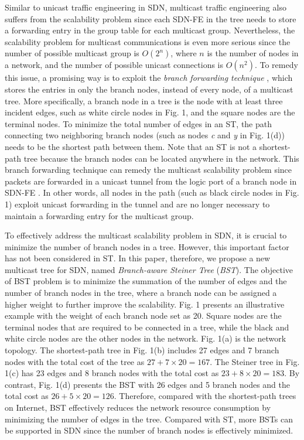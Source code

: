 \documentclass[conference]{IEEEtran}
\begin{document}
Similar to unicast traffic engineering in SDN, multicast traffic engineering
also suffers from the scalability problem since each SDN-FE in the tree
needs to store a forwarding entry in the group table for each multicast
group. Nevertheless, the scalability problem for multicast communications is
even more serious since the number of possible multicast group is $O(2^{n})$, where $n$ is the number of nodes in a network, and the number of possible
unicast connections is $O(n^{2})$. To remedy this issue, a promising way is
to exploit the \textit{branch forwarding technique} \cite{Yang2008, YangLiao2008, Tian1998, Stoica2000, Wong2000}, which stores the
entries in only the branch nodes, instead of every node, of a multicast
tree. More specifically, a branch node in a tree is the node with at least
three incident edges, such as white circle nodes in Fig. 1, and the square nodes are the terminal nodes. To
minimize the total number of edges in an ST, the path connecting two
neighboring branch nodes (such as nodes \textit{c} and \textit{y} in Fig. 1(d))
needs to be the shortest path between them. Note that an ST is not a
shortest-path tree because the branch nodes can be located anywhere in the
network. This branch forwarding technique can remedy the multicast
scalability problem since packets are forwarded in a unicast tunnel from the
logic port of a branch node in SDN-FE \cite{OpenFlow2013}. In other words, all nodes
in the path (such as black circle nodes in
Fig. 1) exploit unicast forwarding in the tunnel and are no longer necessary to maintain a forwarding entry for the multicast
group.

To effectively address the multicast scalability problem in SDN, it is
crucial to minimize the number of branch nodes in a tree. However, this
important factor has not been considered in ST. In this paper, therefore, we
propose a new multicast tree for SDN, named \textit{Branch-aware Steiner Tree} (\textit{BST}). The objective of BST problem is to minimize the summation
of the number of edges and the number of branch nodes in the tree, where a
branch node can be assigned a higher weight to further improve the
scalability. Fig. 1 presents an illustrative example with the weight of each
branch node set as 20. Square nodes are the terminal nodes that are required
to be connected in a tree, while the black and white circle nodes are the
other nodes in the network. Fig. 1(a) is the network topology. The
shortest-path tree in Fig. 1(b) includes 27 edges and 7 branch nodes with
the total cost of the tree as $27+7\times 20=167$. The Steiner tree in Fig.
1(c) has 23 edges and 8 branch nodes with the total cost as $23+8\times
20=183$. By contrast, Fig. 1(d) presents the BST with 26 edges and 5 branch
nodes and the total cost as $26+5\times 20=126$. Therefore, compared with the
shortest-path trees on Internet, BST effectively reduces the network
resource consumption by minimizing the number of edges in the tree. Compared
with ST, more BSTs can be supported in SDN since the number of branch nodes
is effectively minimized.
\end{document}
